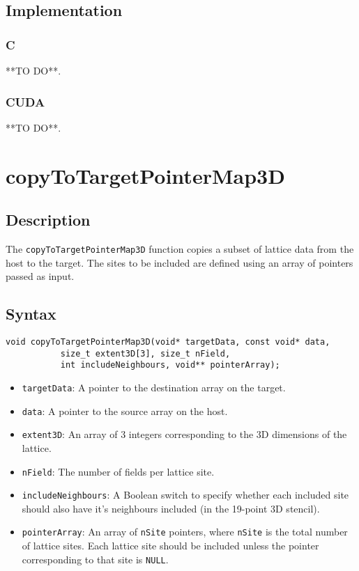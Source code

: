\subsection{Implementation}
\subsubsection{C}
**TO DO**.
\subsubsection{CUDA}
**TO DO**.
\newpage
\section{copyToTargetPointerMap3D}

\subsection{Description}

The \verb+copyToTargetPointerMap3D+ function copies a subset of lattice data from the host to the target. The sites to be included are defined using an array of pointers passed as input.

\subsection{Syntax}
\begin{verbatim}
void copyToTargetPointerMap3D(void* targetData, const void* data, 
           size_t extent3D[3], size_t nField, 
           int includeNeighbours, void** pointerArray);
\end{verbatim}

\begin{itemize}
\item \verb+targetData+: A pointer to the destination array on the target.
\item \verb+data+: A pointer to the source array on the host.
\item \verb+extent3D+: An array of 3 integers corresponding to the 3D dimensions of the lattice.
\item \verb+nField+: The number of fields per lattice site.
\item \verb+includeNeighbours+: A Boolean switch to specify whether each included site should also have it's neighbours included (in the 19-point 3D stencil).
\item \verb+pointerArray+: An array of \verb+nSite+ pointers, where \verb+nSite+ is the total number of lattice sites. Each lattice site should be included unless the pointer corresponding to that site is \verb+NULL+.  
\end{itemize}



